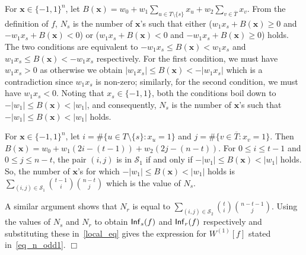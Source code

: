 \documentclass[11pt]{article}
\newtheorem{remark}{Remark}
\newenvironment{proof}{\noindent{\bf Proof:}\indent}%
                      {\hfill $\Box$\par}
\newcommand{\sym}[1]{{\sf #1}}
\begin{document}
\begin{proof}
	For $\mathbf{x}\in\{-1,1\}^n$, let $B(\mathbf{x})=w_0+ w_1 \sum_{u\in T\setminus\{s\}}x_u+ w_2\sum_{v\in \overline{T}}x_v$. From the definition of $f$, 
	$N_s$ is the number of $\mathbf{x}$'s such that either ($w_1x_s+B(\mathbf{x}) \geq 0$ and $-w_1x_s+B(\mathbf{x})<0$) or ($w_1x_s+B(\mathbf{x}) < 0$ and 
	$-w_1x_s+B(\mathbf{x})\geq0$) holds. The two conditions are equivalent to 
	$-w_1x_s\leq B(\mathbf{x}) < w_1x_s$ and $w_1x_s\leq B(\mathbf{x}) < -w_1x_s$ respectively. For the first condition, we must have $w_1x_s>0$ as
	otherwise we obtain $|w_1x_s|\leq B(\mathbf{x})<-|w_1x_s|$ which is a contradiction since $w_1x_s$ is non-zero; similarly, for the 
	second condition, we must have $w_1x_s<0$. Noting that $x_s\in\{-1,1\}$, both the conditions 
	boil down to $-|w_1|\leq B(\mathbf{x})<|w_1|$, and consequently, $N_s$ is the number of $\mathbf{x}$'s such that $-|w_1|\leq B(\mathbf{x}) <|w_1|$ holds.

	For $\mathbf{x}\in \{-1,1\}^n$, let $i=\#\{u\in T\setminus\{s\}:x_u=1\}$ and $j=\#\{v\in \overline{T}:x_v=1\}$. Then $B(\mathbf{x})=w_0+w_1(2i-(t-1))+w_2(2j-(n-t))$. 
	For $0\leq i\leq t-1$ and $0\leq j\leq n-t$, the pair $(i,j)$ is in $\mathcal{S}_1$ if and only if $-|w_1|\leq B(\mathbf{x})<|w_1|$ holds. So, the number of $\mathbf{x}$'s 
	for which $-|w_1|\leq B(\mathbf{x}) <|w_1|$ holds is $\sum_{(i,j)\in \mathcal{S}_1} {t-1\choose i}{n-t\choose j}$ which is the value of $N_s$. 
	
	A similar argument shows that $N_r$ is equal to $\sum_{(i,j)\in\mathcal{S}_{2}}{t \choose i}{n-t-1\choose j}$. 
	Using the values of $N_s$ and $N_r$ to obtain $\sym{Inf}_s(f)$ and $\sym{Inf}_r(f)$ respectively and substituting these in~\eqref{local_eq} gives
	the expression for ${W}^{(1)}[f]$ stated in~\eqref{eq_n_odd1}.
\end{proof}
\end{document}
